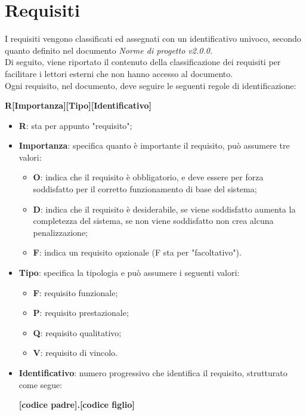 \section{Requisiti}\label{Requisiti}

I requisiti vengono classificati ed assegnati con un identificativo univoco, secondo quanto definito nel documento \textit{Norme di progetto v2.0.0.}
\\
Di seguito, viene riportato il contenuto della classificazione dei requisiti per facilitare i lettori esterni che non hanno accesso al documento.
\\
Ogni requisito, nel documento, deve seguire le seguenti regole di identificazione:
\begin{center}
	\textbf{R[Importanza][Tipo][Identificativo]}
\end{center}  
\begin{itemize}
	\item \textbf{R}: sta per appunto "requisito";
	\item \textbf{Importanza}: specifica quanto è importante il requisito, può assumere tre valori:
	\begin{itemize}
		\item \textbf{O}: indica che il requisito è obbligatorio, e deve essere per forza soddisfatto per il corretto funzionamento di base del sistema;
		\item \textbf{D}: indica che il requisito è desiderabile, se viene soddisfatto aumenta la completezza del sistema, se non viene soddisfatto non crea alcuna penalizzazione;
		\item \textbf{F}: indica un requisito opzionale (F sta per "facoltativo"). 
	\end{itemize}
	\item \textbf{Tipo}: specifica la tipologia e può assumere i seguenti valori:
	\begin{itemize}
		\item \textbf{F}: requisito funzionale;
		\item \textbf{P}: requisito prestazionale;
		\item \textbf{Q}: requisito qualitativo;
		\item \textbf{V}: requisito di vincolo.
	\end{itemize}
	\item \textbf{Identificativo}: numero progressivo che identifica il requisito, strutturato come segue: 
	\begin{center}
		\textbf{[codice padre].[codice figlio]}	
	\end{center}
\end{itemize}

